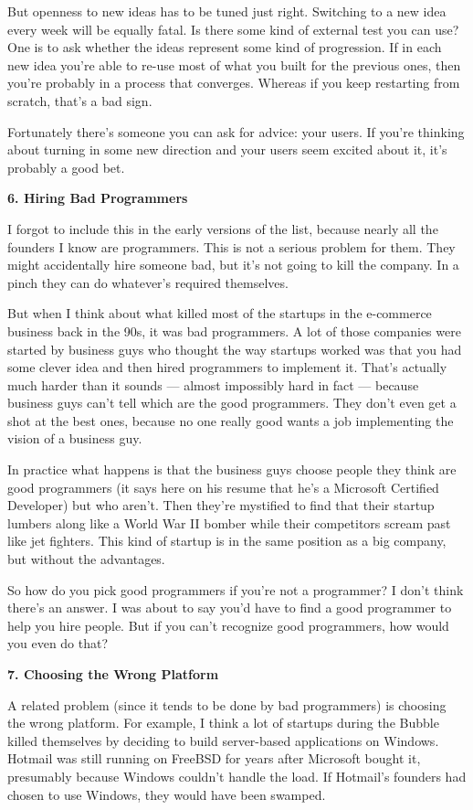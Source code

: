 But openness to new ideas has to be tuned just right. Switching to a new
idea every week will be equally fatal. Is there some kind of external
test you can use? One is to ask whether the ideas represent some kind of
progression. If in each new idea you're able to re-use most of what you
built for the previous ones, then you're probably in a process that
converges. Whereas if you keep restarting from scratch, that's a bad
sign.

Fortunately there's someone you can ask for advice: your users. If
you're thinking about turning in some new direction and your users seem
excited about it, it's probably a good bet.

\textbf{6. Hiring Bad Programmers}

I forgot to include this in the early versions of the list, because
nearly all the founders I know are programmers. This is not a serious
problem for them. They might accidentally hire someone bad, but it's not
going to kill the company. In a pinch they can do whatever's required
themselves.

But when I think about what killed most of the startups in the
e-commerce business back in the 90s, it was bad programmers. A lot of
those companies were started by business guys who thought the way
startups worked was that you had some clever idea and then hired
programmers to implement it. That's actually much harder than it sounds
--- almost impossibly hard in fact --- because business guys can't tell
which are the good programmers. They don't even get a shot at the best
ones, because no one really good wants a job implementing the vision of
a business guy.

In practice what happens is that the business guys choose people they
think are good programmers (it says here on his resume that he's a
Microsoft Certified Developer) but who aren't. Then they're mystified to
find that their startup lumbers along like a World War II bomber while
their competitors scream past like jet fighters. This kind of startup is
in the same position as a big company, but without the advantages.

So how do you pick good programmers if you're not a programmer? I don't
think there's an answer. I was about to say you'd have to find a good
programmer to help you hire people. But if you can't recognize good
programmers, how would you even do that?

\textbf{7. Choosing the Wrong Platform}

A related problem (since it tends to be done by bad programmers) is
choosing the wrong platform. For example, I think a lot of startups
during the Bubble killed themselves by deciding to build server-based
applications on Windows. Hotmail was still running on FreeBSD for years
after Microsoft bought it, presumably because Windows couldn't handle
the load. If Hotmail's founders had chosen to use Windows, they would
have been swamped.

